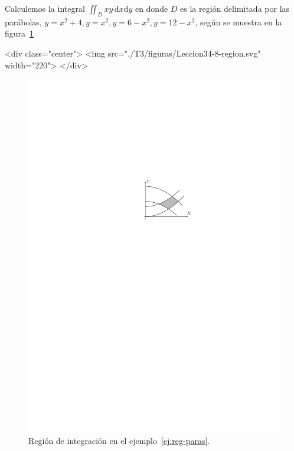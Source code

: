 \begin{ejemplo}\label{ej:reg-paras}
Calculemos la integral $\displaystyle\iint_{D} xy\,\mathrm dx\mathrm dy$ en donde 
$D$ es la región delimitada por las parábolas,
$y=x^2+4, y=x^2, y=6-x^2, y=12-x^2$, según se muestra en la figura~\ref{fig:reg-paras}
\begin{rawhtml}
<div class="center">
<img src="./T3/figuras/Leccion34-8-region.svg" width="220">
</div>
\end{rawhtml}
\begin{latexonly}
\begin{figure}
\begin{center}
\includegraphics{T3/figs/region.pdf}
\end{center}
\caption{Región de integración en el ejemplo~\ref{ej:reg-paras}.}\label{fig:reg-paras}
\end{figure}
\end{latexonly}

\end{ejemplo}
